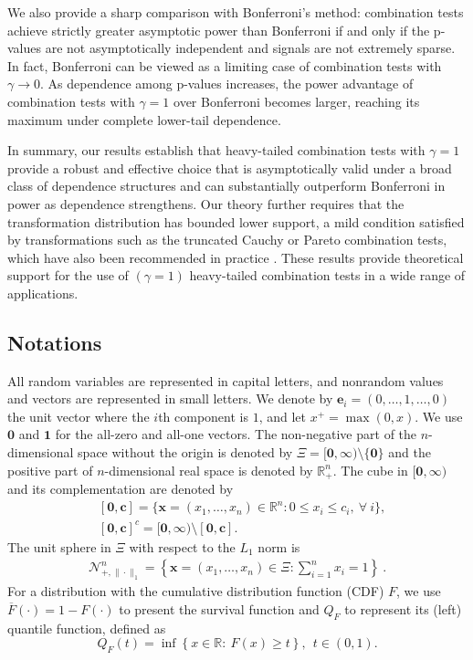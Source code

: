 \documentclass[12pt]{article}
\theoremstyle{plain}
\theoremstyle{plain}
\theoremstyle{definition}
\newcommand{\R}{\mathbb{R}}
\newcommand{\punitsphereone}[1]{\mathcal{N}_{+,\|\cdot\|_1}^{#1}}
\newcommand{\prnspace}[1]{\mathbb{R}_+^{#1}}
\begin{document}
 We also provide a sharp comparison with Bonferroni's method: combination tests achieve strictly greater asymptotic power than Bonferroni if and only if the 
p-values are not asymptotically independent and signals are not extremely sparse.
 In fact, Bonferroni can be viewed as a limiting case of combination tests with $\gamma \to 0$. As dependence among p-values increases, the power advantage of combination tests with $\gamma = 1$ over Bonferroni becomes larger, reaching its maximum under complete lower-tail dependence.


In summary, our results establish that heavy-tailed combination tests with $\gamma = 1$ provide a robust and effective choice that is asymptotically valid under a broad class of dependence structures and can substantially outperform Bonferroni in power as dependence strengthens. Our theory further requires that the transformation distribution has bounded lower support, a mild condition satisfied by transformations such as the truncated Cauchy or Pareto combination tests, which have also been recommended in practice \citep{gui2023aggregating,fang2023heavy,liu2025heavily}. These results provide theoretical support for the use of $(\gamma=1)$ heavy-tailed combination tests in a wide range of applications.




\subsection{Notations}

All random variables are represented in capital letters, and nonrandom values and vectors are represented in small letters. 
We denote by $\mathbf{e}_i=(0,\dots,1,\dots,0)$   the unit vector where the $i$th component is $1$, and let $x^+=\max(0,x)$. We use $\mathbf{0}$ and    $\mathbf{1}$ for the all-zero and all-one vectors. The non-negative part of the $n$-dimensional space without the origin is denoted by $\Xi=[\mathbf{0},\bm{\infty})\setminus\{\mathbf{0}\}$ and the positive part of $n$-dimensional real space is denoted by $\prnspace{n}$. The cube in $[\mathbf{0},\bm{\infty})$ and its complementation are denoted by
\begin{align*}
    & [\mathbf{0},\mathbf{c}]=\{\mathbf{x}=(x_1,\dots,x_n)\in\R^n:0\le x_i\le c_i,~\forall~i\},\\
    & [\mathbf{0},\mathbf{c}]^c=[\mathbf{0},\bm{\infty})\setminus[\mathbf{0},\mathbf{c}].
\end{align*} The unit sphere in $\Xi$ with respect to the $L_1$ norm is 
\begin{align*}
    \punitsphereone{n}=
    \left\{\mathbf{x}=(x_1,\dots,x_n)\in\Xi:\sum_{i=1}^n x_i=1\right\}~.
\end{align*}
For a distribution with the cumulative distribution function (CDF) $F$, we use  $\overline{F}(\cdot)=1-F(\cdot)$ to present the survival function and $Q_F$ to represent
its (left) quantile function, defined as
\[
Q_F(t) = \inf\left\{x\in\mathbb{R}:\  F(x) \ge t \right\}, ~~t\in (0,1).
\]
\end{document}
